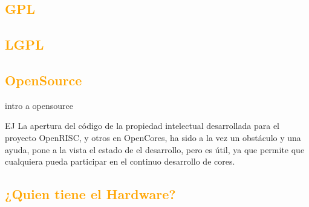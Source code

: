 \documentclass[a4paper,11pt]{article}
\begin{document}
		\subsection{\textcolor{orange}{GPL}}
		\subsection{\textcolor{orange}{LGPL}}
		\subsection{\textcolor{orange}{OpenSource}}
intro a opensource

EJ
La apertura del código de la propiedad intelectual desarrollada para el proyecto OpenRISC, y otros en OpenCores, ha sido a la vez un obstáculo y una ayuda, pone a la vista el estado de el desarrollo, pero es útil, ya que permite que cualquiera pueda participar en el continuo desarrollo de cores. %
		\subsection{\textcolor{orange}{¿Quien tiene el Hardware?}} 
\end{document}
